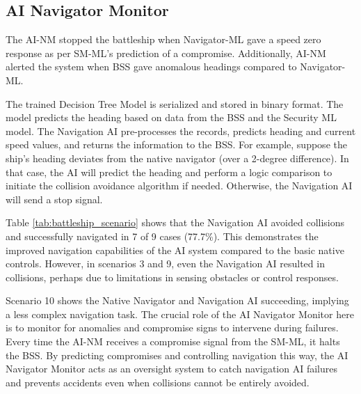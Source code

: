 \documentclass[conference]{IEEEtran}
\begin{document}
\subsection{AI Navigator Monitor}
The AI-NM stopped the battleship when Navigator-ML gave a speed zero response as per SM-ML's prediction of a compromise. Additionally, AI-NM alerted the system when BSS gave anomalous headings compared to Navigator-ML.

The trained Decision Tree Model is serialized and stored in binary format. The model predicts the heading based on data from the BSS and the Security ML model. The Navigation AI pre-processes the records, predicts heading and current speed values, and returns the information to the BSS. For example, suppose the ship's heading deviates from the native navigator (over a 2-degree difference). In that case, the AI will predict the heading and perform a logic comparison to initiate the collision avoidance algorithm if needed.  Otherwise, the Navigation AI will send a stop signal.

Table \ref{tab:battleship_scenario} shows that the Navigation AI avoided collisions and successfully navigated in 7 of 9 cases (77.7\%). This demonstrates the improved navigation capabilities of the AI system compared to the basic native controls. However, in scenarios 3 and 9, even the Navigation AI resulted in collisions, perhaps due to limitations in sensing obstacles or control responses.

Scenario 10 shows the Native Navigator and Navigation AI succeeding, implying a less complex navigation task.  The crucial role of the AI Navigator Monitor here is to monitor for anomalies and compromise signs to intervene during failures. Every time the AI-NM receives a compromise signal from the SM-ML, it halts the BSS. By predicting compromises and controlling navigation this way, the AI Navigator Monitor acts as an oversight system to catch navigation AI failures and prevents accidents even when collisions cannot be entirely avoided.
\end{document}
